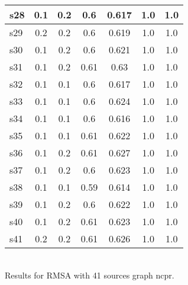 \documentclass{article}
\begin{document}
\begin{tabular}{|l|c|c|c|c|c|c|}
\hline
s28 &0.1 & 0.2 & 0.6 & 0.617 & 1.0 & 1.0\\
\hline
s29 &0.2 & 0.2 & 0.6 & 0.619 & 1.0 & 1.0\\
\hline
s30 &0.1 & 0.2 & 0.6 & 0.621 & 1.0 & 1.0\\
\hline
s31 &0.1 & 0.2 & 0.61 & 0.63 & 1.0 & 1.0\\
\hline
s32 &0.1 & 0.1 & 0.6 & 0.617 & 1.0 & 1.0\\
\hline
s33 &0.1 & 0.1 & 0.6 & 0.624 & 1.0 & 1.0\\
\hline
s34 &0.1 & 0.1 & 0.6 & 0.616 & 1.0 & 1.0\\
\hline
s35 &0.1 & 0.1 & 0.61 & 0.622 & 1.0 & 1.0\\
\hline
s36 &0.1 & 0.2 & 0.61 & 0.627 & 1.0 & 1.0\\
\hline
s37 &0.1 & 0.2 & 0.6 & 0.623 & 1.0 & 1.0\\
\hline
s38 &0.1 & 0.1 & 0.59 & 0.614 & 1.0 & 1.0\\
\hline
s39 &0.1 & 0.2 & 0.6 & 0.622 & 1.0 & 1.0\\
\hline
s40 &0.1 & 0.2 & 0.61 & 0.623 & 1.0 & 1.0\\
\hline
s41 &0.2 & 0.2 & 0.61 & 0.626 & 1.0 & 1.0\\
\hline
\end{tabular}\\

\noindent Results for RMSA with 41 sources graph ncpr.
\end{document}
